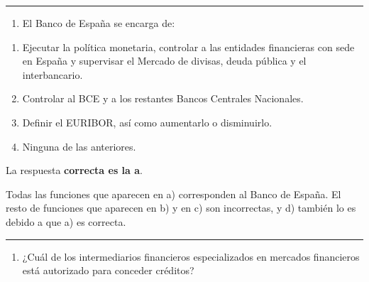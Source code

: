 \documentclass[
  letterpaper,
  DIV=11,
  numbers=noendperiod]{scrreprt}
\providecommand{\tightlist}{%
  \setlength{\itemsep}{0pt}\setlength{\parskip}{0pt}}\usepackage{longtable,booktabs,array}
\begin{document}
\begin{center}\rule{0.5\linewidth}{0.5pt}\end{center}

\begin{enumerate}
\def\labelenumi{\arabic{enumi}.}
\setcounter{enumi}{25}
\tightlist
\item
  El Banco de España se encarga de:
\end{enumerate}

\begin{enumerate}
\def\labelenumi{\alph{enumi})}
\item
  Ejecutar la política monetaria, controlar a las entidades financieras
  con sede en España y supervisar el Mercado de divisas, deuda pública y
  el interbancario.
\item
  Controlar al BCE y a los restantes Bancos Centrales Nacionales.
\item
  Definir el EURIBOR, así como aumentarlo o disminuirlo.
\item
  Ninguna de las anteriores.
\end{enumerate}

\begin{tcolorbox}[enhanced jigsaw, left=2mm, opacityback=0, colback=white, breakable, arc=.35mm, bottomrule=.15mm, rightrule=.15mm, toprule=.15mm, leftrule=.75mm, colframe=quarto-callout-tip-color-frame]
\begin{minipage}[t]{5.5mm}
\textcolor{quarto-callout-tip-color}{\faLightbulb}
\end{minipage}%
\begin{minipage}[t]{\textwidth - 5.5mm}

La respuesta \textbf{correcta es la a}.

Todas las funciones que aparecen en a) corresponden al Banco de España.
El resto de funciones que aparecen en b) y en c) son incorrectas, y d)
también lo es debido a que a) es correcta.

\end{minipage}%
\end{tcolorbox}

\begin{center}\rule{0.5\linewidth}{0.5pt}\end{center}

\begin{enumerate}
\def\labelenumi{\arabic{enumi}.}
\setcounter{enumi}{26}
\tightlist
\item
  ¿Cuál de los intermediarios financieros especializados en mercados
  financieros está autorizado para conceder créditos?
\end{enumerate}
\end{document}
